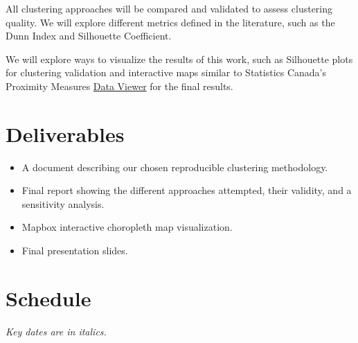 \documentclass[11pt, a4paper]{article}
\begin{document}
All clustering approaches will be compared and validated to assess clustering quality. We will explore different metrics defined in the literature, such as the Dunn Index and Silhouette Coefficient. 
\par 
We will explore ways to visualize the results of this work, such as Silhouette plots for clustering validation and interactive maps similar to Statistics Canada’s Proximity Measures \href{https://www150.statcan.gc.ca/n1/pub/71-607-x/71-607-x2020011-eng.htm}{Data Viewer} for the final results. 




\section*{Deliverables}

\begin{itemize}
\item A document describing our chosen reproducible clustering methodology.
\item Final report showing the different approaches attempted, their validity, and a sensitivity analysis. 
\item Mapbox interactive choropleth map visualization. 
\item Final presentation slides. 
\end{itemize}




\pagebreak 
\section*{Schedule}

\textit{Key dates are in italics.}
\end{document}
